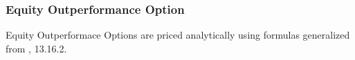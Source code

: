 \subsubsection{Equity Outperformance Option}
\label{pricing:eq_outperformaceoption}

Equity Outperformace Options are priced analytically using formulas generalized from \cite{Brigo_Mercurio_2006}, 13.16.2.
